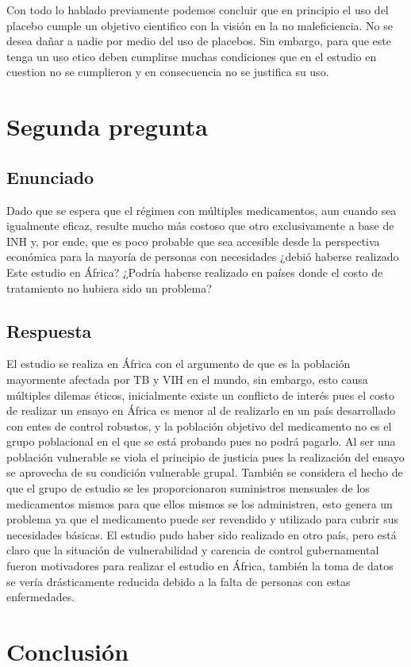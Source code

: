 \documentclass{report}
\begin{document}
Con  todo lo hablado previamente podemos concluir que en principio el uso del placebo cumple un objetivo cientifico con la visión en la no maleficiencia. No se desea dañar a nadie por medio del uso de placebos. Sin embargo, para que este tenga un uso etico deben cumplirse muchas condiciones que en el estudio en cuestion no se cumplieron y en consecuencia no se justifica su uso.

\chapter{Segunda pregunta}
\section*{Enunciado}
Dado que se espera que el régimen con múltiples medicamentos, aun cuando sea igualmente eficaz, resulte mucho más costoso que otro exclusivamente a base de
INH y, por ende, que es poco probable que sea accesible desde la perspectiva económica para la mayoría de personas con necesidades ¿debió haberse realizado
Este estudio en África? ¿Podría haberse realizado en países donde el costo de tratamiento no hubiera sido un problema?

\section*{Respuesta}
El estudio se realiza en África con el argumento de que es la población mayormente afectada por TB y VIH en el mundo, sin embargo, esto causa múltiples dilemas éticos, inicialmente existe un conflicto de interés pues el costo de realizar un ensayo en África es menor al de realizarlo en un país desarrollado con entes de control robustos, y la población objetivo del medicamento no es el grupo poblacional en el que se está probando pues no podrá pagarlo. Al ser una población vulnerable se viola el principio de justicia pues la realización del ensayo se aprovecha de su condición vulnerable grupal. También se considera el hecho de que el grupo de estudio se les proporcionaron suministros mensuales de los medicamentos mismos para que ellos mismos se los administren, esto genera un problema ya que el medicamento puede ser revendido y utilizado para cubrir sus necesidades básicas. El estudio pudo haber sido realizado en otro país, pero está claro que la situación de vulnerabilidad y carencia de control gubernamental fueron motivadores para realizar el estudio en África, también la toma de datos se vería drásticamente reducida debido a la falta de personas con estas enfermedades.

\chapter{Conclusión}
\end{document}
